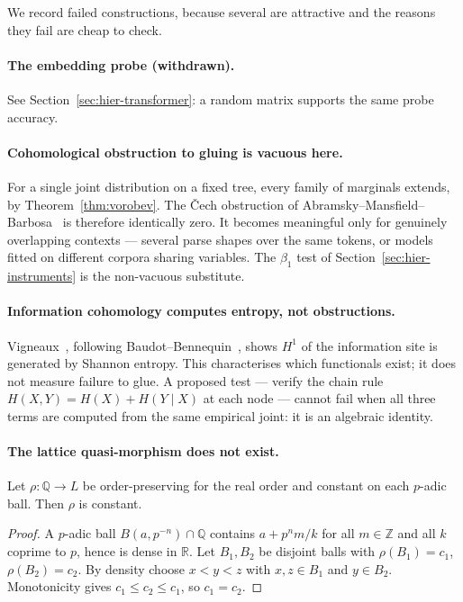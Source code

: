 We record failed constructions, because several are attractive and the reasons
they fail are cheap to check.

\paragraph{The embedding probe (withdrawn).}
See Section~\ref{sec:hier-transformer}: a random matrix supports the same
probe accuracy.

\paragraph{Cohomological obstruction to gluing is vacuous here.}
For a single joint distribution on a fixed tree, every family of marginals
extends, by Theorem~\ref{thm:vorobev}. The \v{C}ech obstruction of
Abramsky--Mansfield--Barbosa~\cite{amb2011} is therefore identically zero. It
becomes meaningful only for genuinely overlapping contexts --- several parse
shapes over the same tokens, or models fitted on different corpora sharing
variables. The $\beta_1$ test of Section~\ref{sec:hier-instruments} is the
non-vacuous substitute.

\paragraph{Information cohomology computes entropy, not obstructions.}
Vigneaux~\cite{vigneaux2019}, following Baudot--Bennequin~\cite{bb2015}, shows
$H^1$ of the information site is generated by Shannon entropy. This
characterises which functionals exist; it does not measure failure to glue. A
proposed test --- verify the chain rule $H(X,Y)=H(X)+H(Y\mid X)$ at each node
--- cannot fail when all three terms are computed from the same empirical
joint: it is an algebraic identity.

\paragraph{The lattice quasi-morphism does not exist.}

\begin{proposition}\label{prop:padic}
Let $\rho:\mathbb{Q}\to L$ be order-preserving for the real order and constant
on each $p$-adic ball. Then $\rho$ is constant.
\end{proposition}

\begin{proof}
A $p$-adic ball $B(a,p^{-n}) \cap \mathbb{Q}$ contains $a + p^n m/k$ for all
$m \in \mathbb{Z}$ and all $k$ coprime to $p$, hence is dense in $\mathbb{R}$.
Let $B_1, B_2$ be disjoint balls with $\rho(B_1)=c_1$, $\rho(B_2)=c_2$. By
density choose $x<y<z$ with $x,z\in B_1$ and $y\in B_2$. Monotonicity gives
$c_1 \le c_2 \le c_1$, so $c_1=c_2$.
\end{proof}

